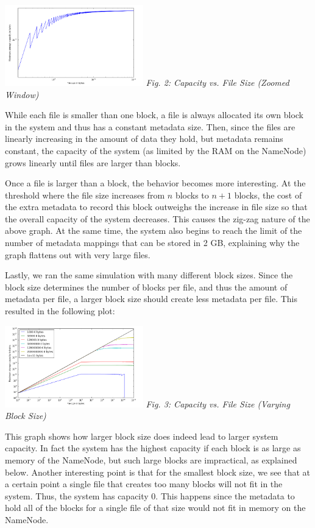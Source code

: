 \documentclass[11pt, a4paper]{article}
\begin{document}
\begin{multicols*}{2}
\begin{center}
	\includegraphics[keepaspectratio=true, width=0.45\textwidth]{logLogScale}
	\textit{Fig. 2: Capacity vs. File Size (Zoomed Window)}	
\end{center}

While each file is smaller than one block, a file is always allocated its own block in the system and thus has a constant metadata size. Then, since the files are linearly increasing in the amount of data they hold, but metadata remains constant, the capacity of the system (as limited by the RAM on the NameNode) grows linearly until files are larger than blocks. 

Once a file is larger than a block, the behavior becomes more interesting. At the threshold where the file size increases from $n$ blocks to $n+1$ blocks, the cost of the extra metadata to record this block outweighs the increase in file size so that the overall capacity of the system decreases. This causes the zig-zag nature of the above graph. At the same time, the system also begins to reach the limit of the number of metadata mappings that can be stored in 2 GB, explaining why the graph flattens out with very large files. 

Lastly, we ran the same simulation with many different block sizes.  Since the block size determines the number of blocks per file, and thus the amount of metadata per file, a larger block size should create less metadata per file. This resulted in the following plot:
\begin{center}
	\includegraphics[keepaspectratio=true, width=0.45\textwidth]{variableBlockSize}	
	\textit{Fig. 3: Capacity vs. File Size (Varying Block Size)}
\end{center}

This graph shows how larger block size does indeed lead to larger system capacity. In fact the system has the highest capacity if each block is as large as memory of the NameNode, but such large blocks are impractical, as explained below. Another interesting point is that for the smallest block size, we see that at a certain point a single file that creates too many blocks will not fit in the system. Thus, the system has capacity 0. This happens since the metadata to hold all of the blocks for a single file of that size would not fit in memory on the NameNode. 


\end{multicols*}
\end{document}

